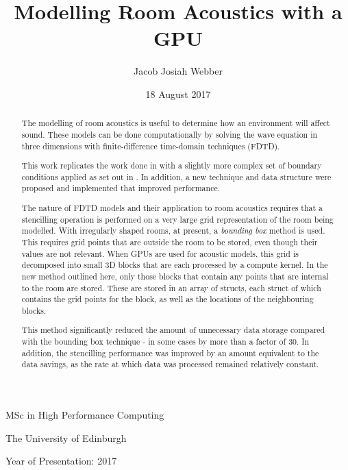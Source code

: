 \documentclass[12pt,a4paper]{report}
\begin{document}




\title{Modelling Room Acoustics with a GPU}
\author{Jacob Josiah Webber}
\date{18 August 2017}

\makeEPCCtitle

\thispagestyle{empty}

\vspace{12cm}

\begin{center}

\large{MSc in High Performance Computing}

\large{The University of Edinburgh}

\large{Year of Presentation: 2017}

\end{center}

\newpage

\begin{abstract}

The modelling of room acoustics is useful to determine how an environment will affect sound. These models can be done computationally by solving the wave equation in three dimensions with finite-difference time-domain techniques (FDTD).

This work replicates the work done in \cite{craig} with a slightly more complex set of boundary conditions applied as set out in \cite{brian}. In addition, a new technique and data structure were proposed and implemented that improved performance.

The nature of FDTD models and their application to room acoustics requires that a stencilling operation is performed on a very large grid representation of the room being modelled. With irregularly shaped rooms, at present, a \textit{bounding box} method is used. This requires grid points that are outside the room to be stored, even though their values are not relevant. When GPUs are used for acoustic models, this grid is decomposed into small 3D blocks that are each processed by a compute kernel. In the new method outlined here, only those blocks that contain any points that are internal to the room are stored. These are stored in an array of structs, each struct of which contains the grid points for the block, as well as the locations of the neighbouring blocks.

This method significantly reduced the amount of unnecessary data storage compared with the bounding box technique - in some cases by more than a factor of 30. In addition, the stencilling performance was improved by an amount equivalent to the data savings, as the rate at which data was processed remained relatively constant.

\end{abstract}
\end{document}
